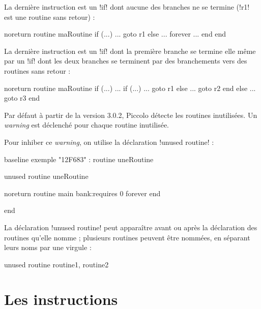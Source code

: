 La dernière instruction est un \pic!if! dont aucune des branches ne se termine (\pic!r1! est une routine sans retour) :
\begin{piccolo}
noreturn routine maRoutine {
  if (...)
    ...
    goto r1
  else
    ...
    forever
      ...
    end
  end
}

\end{piccolo}


La dernière instruction est un \pic!if! dont la première branche se termine elle même par un \pic!if! dont les deux branches se terminent par des branchements vers des routines sans retour :
\begin{piccolo}
noreturn routine maRoutine {
  if (...)
    ...
    if (...)
      ...
      goto r1
    else
      ...
      goto r2
    end
  else
    ...
    goto r3
  end
}
\end{piccolo}






Par défaut à partir de la version 3.0.2, Piccolo détecte les routines inutilisées. Un \emph{warning} est déclenché pour chaque routine inutilisée.

Pour inhiber ce \emph{warning}, on utilise la déclaration \pic!unused routine! :

\begin{piccolo}
baseline exemple "12F683" :
routine uneRoutine {
}

unused routine uneRoutine
 
noreturn routine main bank:requires 0 {
  forever
  end
}

end
\end{piccolo}

La déclaration \pic!unused routine! peut apparaître avant ou après la déclaration des routines qu'elle nomme ; plusieurs routines peuvent être nommées, en séparant leurs noms par une virgule :
\begin{piccolo}
unused routine routine1, routine2
\end{piccolo}







\section{Les instructions}

